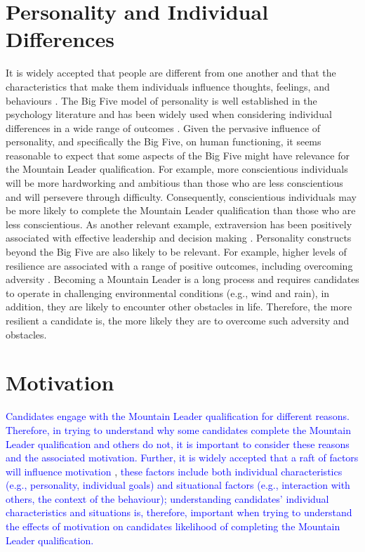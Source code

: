 \documentclass[
  12pt,
  a4paper,
]{book}
\begin{document}
\hypertarget{gen-intro-paid}{%
\section{Personality and Individual Differences}\label{gen-intro-paid}}

It is widely accepted that people are different from one another and that the characteristics that make them individuals influence thoughts, feelings, and behaviours \citep[cf.~][]{Roberts2015}. The Big Five model of personality \citep{McCrae1987} is well established in the psychology literature and has been widely used when considering individual differences in a wide range of outcomes \citep[e.g., behaviour-change, performance, motivation; cf.~][]{Allen2013, Ryan2019}. Given the pervasive influence of personality, and specifically the Big Five, on human functioning, it seems reasonable to expect that some aspects of the Big Five might have relevance for the Mountain Leader qualification. For example, more conscientious individuals will be more hardworking and ambitious than those who are less conscientious \citep{McCrae1987} and will persevere through difficulty. Consequently, conscientious individuals may be more likely to complete the Mountain Leader qualification than those who are less conscientious. As another relevant example, extraversion has been positively associated with effective leadership and decision making \citep{Hardy1996, Judge2002}. Personality constructs beyond the Big Five are also likely to be relevant. For example, higher levels of resilience are associated with a range of positive outcomes, including overcoming adversity \citep[cf.~][]{Smith2008}. Becoming a Mountain Leader is a long process and requires candidates to operate in challenging environmental conditions (e.g., wind and rain), in addition, they are likely to encounter other obstacles in life. Therefore, the more resilient a candidate is, the more likely they are to overcome such adversity and obstacles.

\hypertarget{gen-intro-sdt}{%
\section{Motivation}\label{gen-intro-sdt}}

\textcolor{blue}{Candidates engage with the Mountain Leader qualification for different reasons. Therefore, in trying to understand why some candidates complete the Mountain Leader qualification and others do not, it is important to consider these reasons and the associated motivation. Further, it is widely accepted that a raft of factors will influence motivation} \citep{Deci2000, Weinberg2014}, \textcolor{blue}{these factors include both individual characteristics (e.g., personality, individual goals) and situational factors (e.g., interaction with others, the context of the behaviour); understanding candidates’ individual characteristics and situations is, therefore, important when trying to understand the effects of motivation on candidates likelihood of completing the Mountain Leader qualification.}
\end{document}
